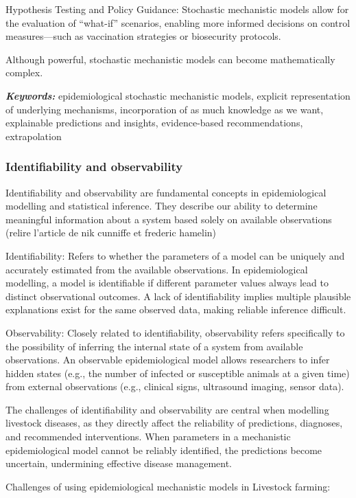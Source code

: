 Hypothesis Testing and Policy Guidance: Stochastic mechanistic models allow for the evaluation of “what-if” scenarios, enabling more informed decisions on control measures—such as vaccination strategies or biosecurity protocols.

Although powerful, stochastic mechanistic models can become mathematically complex.

\textit{\textbf{Keywords:}} epidemiological stochastic mechanistic models, explicit representation of underlying mechanisms, incorporation of as much knowledge as we want, explainable predictions and insights, evidence-based recommendations, extrapolation


\subsubsection{Identifiability and observability}

Identifiability and observability are fundamental concepts in epidemiological modelling and statistical inference. They describe our ability to determine meaningful information about a system based solely on available observations (relire l'article de nik cunniffe et frederic hamelin)

Identifiability: Refers to whether the parameters of a model can be uniquely and accurately estimated from the available observations. In epidemiological modelling, a model is identifiable if different parameter values always lead to distinct observational outcomes. A lack of identifiability implies multiple plausible explanations exist for the same observed data, making reliable inference difficult.

Observability: Closely related to identifiability, observability refers specifically to the possibility of inferring the internal state of a system from available observations. An observable epidemiological model allows researchers to infer hidden states (e.g., the number of infected or susceptible animals at a given time) from external observations (e.g., clinical signs, ultrasound imaging, sensor data).

The challenges of identifiability and observability are central when modelling livestock diseases, as they directly affect the reliability of predictions, diagnoses, and recommended interventions. When parameters in a mechanistic epidemiological model cannot be reliably identified, the predictions become uncertain, undermining effective disease management.

Challenges of using epidemiological mechanistic models in Livestock farming:

